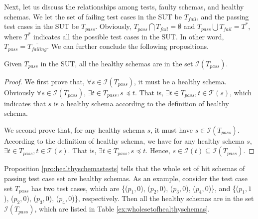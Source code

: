 Next, let us discuss the relationships among tests, faulty schemas, and healthy schemas. We let the set of failing test cases in the SUT be $T_{fail}$, and the passing test cases in the SUT be $T_{pass}$. Obviously, $T_{pass} \bigcap T_{fail} = \emptyset$ and $T_{pass} \bigcup T_{fail} = T^{*}$, where $T^{*}$ indicates all the possible test cases in the SUT. In other word, $T_{pass} = \overline{T_{failing}}$. We can further conclude the following propositions.

\begin{proposition}\label{pro:healthyschemastests}
Given  $T_{pass}$ in the SUT, all the healthy schemas are in the set $\mathcal{I}(T_{pass})$.
\end{proposition}

\begin{proof}
We first prove that, $\forall s \in \mathcal{I}(T_{pass})$, it must be a healthy schema.
Obviously $\forall s \in \mathcal{I}(T_{pass})$, $\exists t \in T_{pass}, s \preceq t$. That is, $\exists t \in T_{pass},  t \in \mathcal{T}(s)$,  which indicates that $s$ is a healthy schema according to the definition of healthy schema.

We second prove that, for any healthy schema $s$, it must have $s \in \mathcal{I}(T_{pass})$.
According to the definition of healthy schema, we have for any healthy schema $s$,  $\exists t \in T_{pass},  t \in \mathcal{T}(s)$. That is,  $\exists t \in T_{pass}, s \preceq t$. Hence, $s \in \mathcal{I}(t) \subseteq  \mathcal{I}(T_{pass})$.
\end{proof}

Proposition \ref{pro:healthyschemastests} tells that the whole set of hit schemas of passing test case set are healthy schemas.  As an example, consider the test case set $T_{pass}$ has two test cases, which are \{($p_{1}, 0$), ($p_{2}, 0$), ($p_{3}, 0$), ($p_{4}, 0$)\}, and \{($p_{1}, 1$), ($p_{2}, 0$), ($p_{3}, 0$), ($p_{4}, 0$)\}, respectively. Then all the healthy schemas are in the set $\mathcal{I}(T_{pass})$, which are listed in Table \ref{ex:wholesetofhealthyschemas}.

